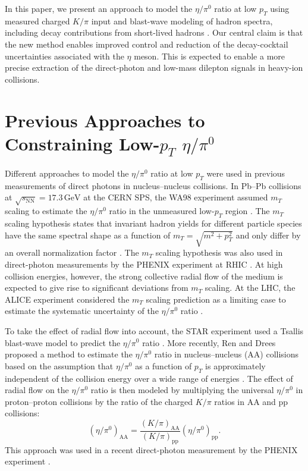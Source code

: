 \documentclass[%
 reprint,
 amsmath,amssymb,
 aps,
prc,
]{revtex4-2}
\begin{document}
In this paper, we present an approach to model the $\eta/\pi^0$ ratio at low $p_T$ using measured charged $K/\pi$ input and blast-wave modeling of hadron spectra, including decay contributions from short-lived hadrons \cite{Mazeliauskas:2019ifr}. Our central claim is that the new method enables improved control and reduction of the decay-cocktail uncertainties associated with the $\eta$ meson. This is expected to enable a more precise extraction of the direct-photon and low-mass dilepton signals in heavy-ion collisions.

\section{\boldmath Previous Approaches to Constraining Low-$p_T$ $\eta/\pi^0$}

Different approaches to model the $\eta/\pi^0$ ratio at low $p_T$ were used in previous measurements of direct photons in nucleus--nucleus collisions. In Pb--Pb collisions at $\sqrt{s_\mathrm{NN}} = 17.3\,\mathrm{GeV}$ at the CERN SPS, the WA98 experiment assumed $m_T$ scaling to estimate the $\eta/\pi^0$ ratio in the unmeasured low-$p_T$ region \cite{WA98:2000vxl}. The $m_T$ scaling hypothesis states that invariant hadron yields for different particle species have the same spectral shape as a function of $m_T = \sqrt{m^2+p_T^2}$ and only differ by an overall normalization factor \cite{Albrecht:1991zza}. The $m_T$ scaling hypothesis was also used in direct-photon measurements by the PHENIX experiment at RHIC \cite{PHENIX:2008uif}. At high collision energies, however, the strong collective radial flow of the medium is expected to give rise to significant deviations from $m_T$ scaling. At the LHC, the ALICE experiment considered the $m_T$ scaling prediction as a limiting case to estimate the systematic uncertainty of the $\eta/\pi^0$ ratio \cite{ALICE:2015xmh}. 

To take the effect of radial flow into account, the STAR experiment used a Tsallis blast-wave model to predict the $\eta/\pi^0$ ratio \cite{STAR:2016use}. More recently, Ren and Drees proposed a method to estimate the $\eta/\pi^0$ ratio in nucleus--nucleus (AA) collisions based on the assumption that $\eta/\pi^0$ as a function of $p_T$ is approximately independent of the collision energy over a wide range of energies \cite{Ren:2021pzi}. The effect of radial flow on the $\eta/\pi^0$ ratio is then modeled by multiplying the universal $\eta/\pi^0$ in proton--proton collisions by the ratio of the charged $K/\pi$ ratios in AA and pp collisions:
\begin{equation}
\left(\eta/\pi^0\right)_{\mathrm{AA}} =
\frac{\left(K/\pi\right)_{\mathrm{AA}}}{\left(K/\pi\right)_{\mathrm{pp}}}
\left(\eta/\pi^0\right)_{\mathrm{pp}}.
\end{equation}
This approach was used in a recent direct-photon measurement by the PHENIX experiment \cite{PHENIX:2022rsx}. 
\end{document}
